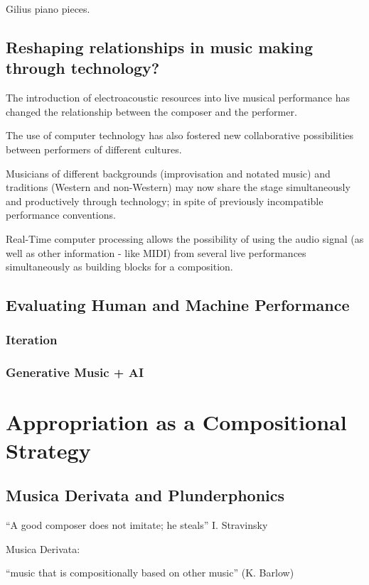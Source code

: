 Gilius piano pieces.

\subsection{Reshaping relationships in music making through technology?}

The introduction of electroacoustic resources into live musical performance has changed the relationship between the composer and the performer. 

The use of computer technology has also fostered new collaborative possibilities between performers of different cultures.

Musicians of different backgrounds (improvisation and notated music) and traditions (Western and non-Western) may now share the stage simultaneously and productively through technology; in spite of previously incompatible performance conventions.

Real-Time computer processing allows the possibility of using the audio signal (as well as other information - like MIDI) from several live performances simultaneously as building blocks for a composition.

\subsection{Evaluating Human and Machine Performance}
\subsubsection {Iteration}
\subsubsection {Generative Music + AI}

\section{Appropriation as a Compositional Strategy}

\subsection{Musica Derivata and Plunderphonics}

``A good composer does not imitate; he steals''       I. Stravinsky

Musica Derivata:

``music that is compositionally based on other music'' (K. Barlow) 

